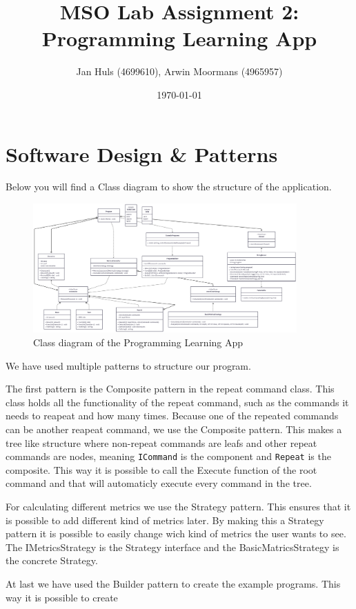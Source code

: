 \documentclass[11pt,a4paper]{article}
\date{\monthyear\today}
\title{\textbf{MSO Lab Assignment 2:\\
Programming Learning App}}
\author{Jan Huls (4699610), Arwin Moormans (4965957)}
\begin{document}
\maketitle
\section*{Software Design \& Patterns}
Below you will find a Class diagram to show the structure of the application.

\begin{figure}[htbp]\label{fig:class-diagram}
  \centering
  \includegraphics[width=0.9\textwidth]{class_diagram.png}
  \caption{\small{Class diagram of the Programming Learning App}}
\end{figure}
We have used multiple patterns to structure our program. 

The first pattern is the Composite pattern in the repeat command class.
This class holds all the functionality of the repeat command, such as the commands it needs to reapeat and how many times.
Because one of the repeated commands can be another reapeat command, we use the Composite pattern.
This makes a tree like structure where non-repeat commands are leafs and other repeat commands are nodes, meaning \texttt{ICommand} is the component and \texttt{Repeat} is the composite.
This way it is possible to call the Execute function of the root command and that will automaticly execute every command in the tree.

For calculating different metrics we use the Strategy pattern.
This ensures that it is possible to add different kind of metrics later.
By making this a Strategy pattern it is possible to easily change wich kind of metrics the user wants to see.
The IMetricsStrategy is the Strategy interface and the BasicMatricsStrategy is the concrete Strategy.

At last we have used the Builder pattern to create the example programs.
This way it is possible to create 
\end{document}
